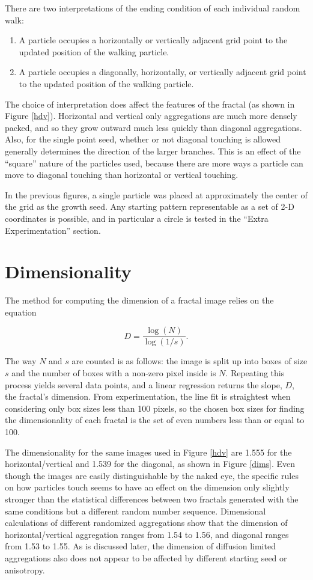 \documentclass[12pt]{article}
\begin{document}
There are two interpretations of the ending condition of each individual random walk:

\begin{enumerate}
\item{A particle occupies a horizontally or vertically adjacent grid point to the updated position of the walking particle.}
\item{A particle occupies a diagonally, horizontally, or vertically adjacent grid point to the updated position of the walking particle.}
\end{enumerate}

The choice of interpretation does affect the features of the fractal (as shown in Figure \ref{hdv}).
Horizontal and vertical only aggregations are much more densely packed, and so they grow outward much less quickly than diagonal aggregations.
Also, for the single point seed, whether or not diagonal touching is allowed generally determines the direction of the larger branches.
This is an effect of the ``square'' nature of the particles used, because there are more ways a particle can move to diagonal touching than horizontal or vertical touching.

In the previous figures, a single particle was placed at approximately the center of the grid as the growth seed.
Any starting pattern representable as a set of 2-D coordinates is possible, and in particular a circle is tested in the ``Extra Experimentation'' section.


\section*{Dimensionality}


The method for computing the dimension of a fractal image relies on the equation

\[
D = \frac{\log(N)}{\log(1/s)} .
\]

The way $N$ and $s$ are counted is as follows: the image is split up into boxes of size $s$ and the number of boxes with a non-zero pixel inside is $N$.
Repeating this process yields several data points, and a linear regression returns the slope, $D$, the fractal's dimension.
From experimentation, the line fit is straightest when considering only box sizes less than 100 pixels, so the chosen box sizes for finding the dimensionality of each fractal is the set of even numbers less than or equal to 100.

The dimensionality for the same images used in Figure \ref{hdv} are 1.555 for the horizontal/vertical and 1.539 for the diagonal, as shown in Figure \ref{dims}.
Even though the images are easily distinguishable by the naked eye, the specific rules on how particles touch seems to have an effect on the dimension only slightly stronger than the statistical differences between two fractals generated with the same conditions but a different random number sequence. 
Dimensional calculations of different randomized aggregations show that the dimension of horizontal/vertical aggregation ranges from 1.54 to 1.56, and diagonal ranges from 1.53 to 1.55.
As is discussed later, the dimension of diffusion limited aggregations also does not appear to be affected by different starting seed or anisotropy.
\end{document}
